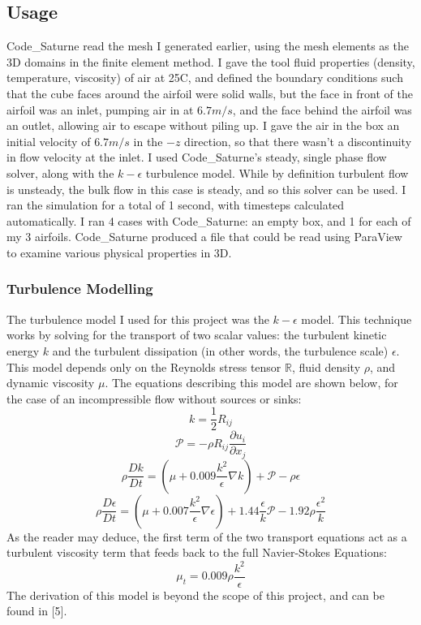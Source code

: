 \documentclass[12pt]{article}
\begin{document}
\subsection{Usage}
Code\_Saturne read the mesh I generated earlier, using the mesh elements as the
3D domains in the finite element method.  I gave the tool fluid properties
(density, temperature, viscosity) of air at 25\degree C, and defined the 
boundary conditions such that the cube faces around the airfoil were solid 
walls, but the face in front of the airfoil was an inlet, pumping air in at
$6.7m/s$, and the face behind the airfoil was an outlet, allowing air to escape
without piling up.  I gave the air in the box an initial velocity of $6.7m/s$
in the $-z$ direction, so that there wasn't a discontinuity in flow velocity
at the inlet.  I used Code\_Saturne's steady, single phase flow solver, along
with the $k-\epsilon$ turbulence model.  While by definition turbulent flow 
is unsteady, the bulk flow in this case is steady, and so this solver can be
used.  I ran the simulation for a total of 1 second, with timesteps calculated
automatically.
I ran 4 cases with Code\_Saturne: an empty box, and 1 for each of my 3 airfoils.
Code\_Saturne produced a file that could be read using ParaView to examine
various physical properties in 3D.

\subsubsection{Turbulence Modelling}
The turbulence model I used for this project was the $k-\epsilon$ model.  This
technique works by solving for the transport of two scalar values: the 
turbulent kinetic energy $k$ and the turbulent dissipation (in other words,
the turbulence scale) $\epsilon$.  This model depends only on the Reynolds 
stress tensor $\mathbb{R}$, fluid density $\rho$, and dynamic viscosity $\mu$.
The equations describing this model are shown below, for the case of an
incompressible flow without sources or sinks:
$$k = \frac{1}{2}R_{ij}$$
$$\mathcal{P} = -\rho R_{ij}\frac{\partial u_i}{\partial x_j}$$
$$\rho\frac{Dk}{Dt} = (\mu+0.009\frac{k^2}{\epsilon}\nabla k)+\mathcal{P} -
\rho\epsilon$$
$$\rho\frac{D\epsilon}{Dt} = (\mu+0.007\frac{k^2}{\epsilon}\nabla\epsilon) +
1.44\frac{\epsilon}{k}\mathcal{P} - 1.92\rho\frac{\epsilon^2}{k}$$
As the reader may deduce, the first term of the two transport equations act
as a turbulent viscosity term that feeds back to the full Navier-Stokes 
Equations:
$$\mu_t = 0.009\rho\frac{k^2}{\epsilon}$$
The derivation of this model is beyond the scope of this project, and can be 
found in [5].  
\end{document}

